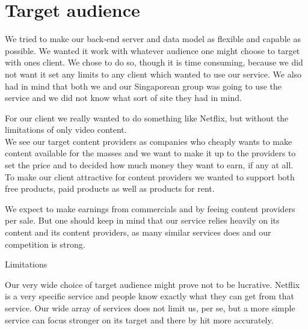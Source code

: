 \section{Target audience}
We tried to make our back-end server and data model as flexible and capable as possible. We wanted it work with whatever audience one might choose to target with ones client. We chose to do so, though it is time consuming, because we did not want it set any limits to any client which wanted to use our service. We also had in mind that both we and our Singaporean group was going to use the service and we did not know what sort of site they had in mind.

For our client we really wanted to do something like Netflix, but without the limitations of only video content. 
\\We see our target content providers as companies who cheaply wants to make content available for the masses and we want to make it up to the providers to set the price and to decided how much money they want to earn, if any at all.
\\To make our client attractive for content providers we wanted to support both free products, paid products as well as products for rent. 

We expect to make earnings from commercials and by feeing content providers per sale. But one should keep in mind that our service relies heavily on its content and its content providers, as many similar services does and our competition is strong.

Limitations

Our very wide choice of target audience might prove not to be lucrative. Netflix is a very specific service and people know exactly what they can get from that service. Our wide array of services does not limit us, per se, but a more simple service can focus stronger on its target and there by hit more accurately.
\newpage